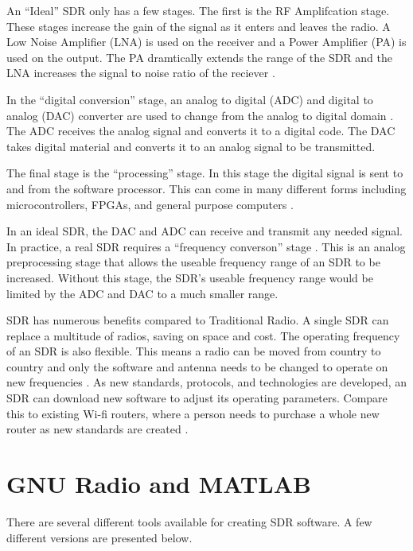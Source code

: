 An ``Ideal'' SDR only has a few stages. The first is the RF Amplifcation stage. These stages increase the gain of the signal as it enters and leaves the radio. A Low Noise Amplifier (LNA) is used on the receiver and a Power Amplifier (PA) is used on the output. The PA dramtically extends the range of the SDR and the LNA increases the signal to noise ratio of the reciever \cite{761033}. 

In the ``digital conversion'' stage, an analog to digital (ADC) and digital to analog (DAC) converter are used to change from the analog to digital domain \cite{761033}\cite{0020}. The ADC receives the analog signal and converts it to a digital code. The DAC takes digital material and converts it to an analog signal to be transmitted. 

The final stage is the ``processing'' stage. In this stage the digital signal is sent to and from the software processor. This can come in many different forms including microcontrollers, FPGAs, and general purpose computers \cite{393001}\cite{0020}.  

In an ideal SDR, the DAC and ADC can receive and transmit any needed signal. In practice, a real SDR requires a ``frequency converson'' stage \cite{393001} \cite{0020}. This is an analog preprocessing stage that allows the useable frequency range of an SDR to be increased. Without this stage, the SDR's useable frequency range would be limited by the ADC and DAC to a much smaller range. 

SDR has numerous benefits compared to Traditional Radio. A single SDR can replace a multitude of radios, saving on space and cost. The operating frequency of an SDR is also flexible. This means a radio can be moved from country to country and only the software and antenna needs to be changed to operate on new frequencies \cite{393001} \cite{0019}. As new standards, protocols, and technologies are developed, an SDR can download new software to adjust its operating parameters. Compare this to existing Wi-fi routers, where a person needs to purchase a whole new router as new standards are created \cite{761033} \cite{0019}. 


\section{GNU Radio and MATLAB}

There are several different tools available for creating SDR software. A few different versions are presented below. 

